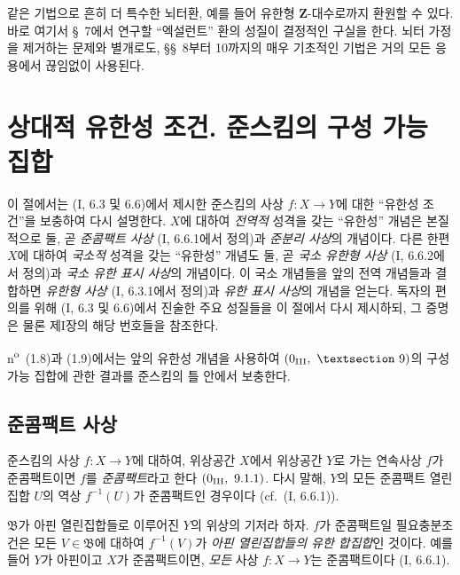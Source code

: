 
같은 기법으로 흔히 더 특수한 뇌터환, 예를 들어 유한형
$\mathbf Z$-대수로까지 환원할 수 있다. 바로 여기서 §~7에서 연구할
``엑설런트'' 환의 성질이 결정적인 구실을 한다. 뇌터 가정을 제거하는
문제와 별개로도, §§~8부터 10까지의 매우 기초적인 기법은 거의 모든
응용에서 끊임없이 사용된다.

\setcounter{section}{0}

\section{상대적 유한성 조건. 준스킴의 구성 가능 집합}
\label{section:IV.1-fr}

이 절에서는 (I, 6.3 및 6.6)에서 제시한 준스킴의 사상
$f:X\to Y$에 대한 ``유한성 조건''을 보충하여 다시 설명한다. $X$에
대하여 \emph{전역적} 성격을 갖는 ``유한성'' 개념은 본질적으로 둘,
곧 \emph{준콤팩트 사상} (I, 6.6.1에서 정의)과 \emph{준분리 사상}의
개념이다. 다른 한편 $X$에 대하여 \emph{국소적} 성격을 갖는
``유한성'' 개념도 둘, 곧 \emph{국소 유한형 사상} (I, 6.6.2에서
정의)과 \emph{국소 유한 표시 사상}의 개념이다. 이 국소 개념들을
앞의 전역 개념들과 결합하면 \emph{유한형 사상} (I, 6.3.1에서
정의)과 \emph{유한 표시 사상}의 개념을 얻는다. 독자의 편의를 위해
(I, 6.3 및 6.6)에서 진술한 주요 성질들을 이 절에서 다시 제시하되,
그 증명은 물론 제I장의 해당 번호들을 참조한다.

n\textsuperscript{o}~(1.8)과 (1.9)에서는 앞의 유한성 개념을
사용하여 $(0\textsubscript{III},~§~9)$의 구성 가능 집합에 관한
결과를 준스킴의 틀 안에서 보충한다.

\subsection{준콤팩트 사상}
\label{subsection:IV.1.1-fr}

\begin{definition}[1.1.1]
\label{IV.1.1.1-fr}
준스킴의 사상 $f:X\to Y$에 대하여, 위상공간 $X$에서 위상공간
$Y$로 가는 연속사상 $f$가 준콤팩트이면 $f$를 \emph{준콤팩트}라고
한다 $(0\textsubscript{III},~9.1.1)$. 다시 말해, $Y$의 모든
준콤팩트 열린집합 $U$의 역상 $f^{-1}(U)$가 준콤팩트인 경우이다
(cf.~(I, 6.6.1)).
\end{definition}

$\mathfrak B$가 아핀 열린집합들로 이루어진 $Y$의 위상의 기저라
하자. $f$가 준콤팩트일 필요충분조건은 모든 $V\in\mathfrak B$에
대하여 $f^{-1}(V)$가 \emph{아핀 열린집합들의 유한 합집합}인 것이다.
예를 들어 $Y$가 아핀이고 $X$가 준콤팩트이면, \emph{모든} 사상
$f:X\to Y$는 준콤팩트이다 (I, 6.6.1).

